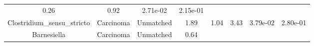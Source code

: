 \documentclass[12pt,]{article}
\begin{document}
\begin{longtable}[]{@{}cccccccc@{}}
\begin{minipage}[t]{0.14\columnwidth}
0.26\strut
\end{minipage} & \begin{minipage}[t]{0.14\columnwidth}\centering\strut
0.92\strut
\end{minipage} & \begin{minipage}[t]{0.06\columnwidth}\centering\strut
2.71e-02\strut
\end{minipage} & \begin{minipage}[t]{0.06\columnwidth}\centering\strut
2.15e-01\strut
\end{minipage}\tabularnewline
\begin{minipage}[t]{0.18\columnwidth}\centering\strut
Clostridium\_sensu\_stricto\strut
\end{minipage} & \begin{minipage}[t]{0.07\columnwidth}\centering\strut
Carcinoma\strut
\end{minipage} & \begin{minipage}[t]{0.09\columnwidth}\centering\strut
Unmatched\strut
\end{minipage} & \begin{minipage}[t]{0.03\columnwidth}\centering\strut
1.89\strut
\end{minipage} & \begin{minipage}[t]{0.14\columnwidth}\centering\strut
1.04\strut
\end{minipage} & \begin{minipage}[t]{0.14\columnwidth}\centering\strut
3.43\strut
\end{minipage} & \begin{minipage}[t]{0.06\columnwidth}\centering\strut
3.79e-02\strut
\end{minipage} & \begin{minipage}[t]{0.06\columnwidth}\centering\strut
2.80e-01\strut
\end{minipage}\tabularnewline
\begin{minipage}[t]{0.18\columnwidth}\centering\strut
Barnesiella\strut
\end{minipage} & \begin{minipage}[t]{0.07\columnwidth}\centering\strut
Carcinoma\strut
\end{minipage} & \begin{minipage}[t]{0.09\columnwidth}\centering\strut
Unmatched\strut
\end{minipage} & \begin{minipage}[t]{0.03\columnwidth}\centering\strut
0.64\strut
\end{minipage} & \begin{minipage}[t]{0.14\columnwidth}\centering\strut

\end{minipage}
\end{longtable}
\end{document}
